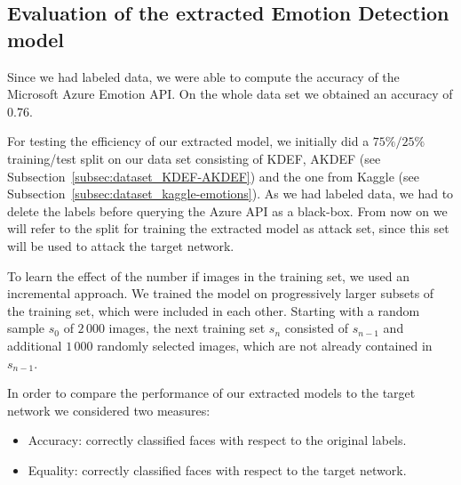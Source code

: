\documentclass[a4paper,11pt]{article}
\begin{document}
        
    \subsection{Evaluation of the extracted Emotion Detection model}
        Since we had labeled data, we were able to compute the accuracy of the Microsoft Azure Emotion API. On the whole data set we obtained an accuracy of $0.76$.
        
        For testing the efficiency of our extracted model, we initially did a $75\%/25\%$ training/test split on our data set consisting of KDEF, AKDEF (see Subsection~\ref{subsec:dataset_KDEF-AKDEF}) and the one from Kaggle (see Subsection~\ref{subsec:dataset_kaggle-emotions}). As we had labeled data, we had to delete the labels before querying the Azure API as a black-box. From now on we will refer to the split for training the extracted model as attack set, since this set will be used to attack the target network.
        
        To learn the effect of the number if images in the training set, we used an incremental approach. We trained the model on progressively larger subsets of the training set, which were included in each other. Starting with a random sample $s_0$ of $2\,000$ images, the next training set $s_n$ consisted of $s_{n-1}$ and additional $1\,000$ randomly selected images, which are not already contained in $s_{n-1}$.
        
        In order to compare the performance of our extracted models to the target network we considered two measures:
        \begin{itemize}
            \item Accuracy: correctly classified faces with respect to the original labels.
            \item Equality: correctly classified faces with respect to the target network.  
        \end{itemize}
        
        
\end{document}
